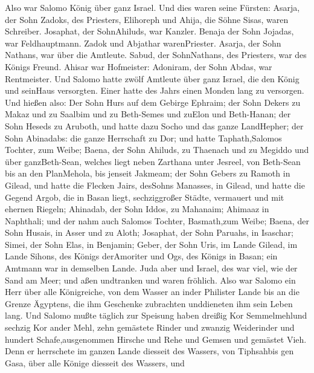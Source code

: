  Also war Salomo König über ganz Israel.  Und
dies waren seine Fürsten: Asarja, der Sohn Zadoks, des Priesters,
 Elihoreph und Ahija, die Söhne Sisas, waren Schreiber.
Josaphat, der SohnAhiluds, war Kanzler.  Benaja der Sohn
Jojadas, war Feldhauptmann. Zadok und Abjathar warenPriester.
 Asarja, der Sohn Nathans, war über die Amtleute. Sabud, der
SohnNathans, des Priesters, war des Königs Freund.  Ahisar
war Hofmeister: Adoniram, der Sohn Abdas, war Rentmeister. 
Und Salomo hatte zwölf Amtleute über ganz Israel, die den König und
seinHaus versorgten. Einer hatte des Jahrs einen Monden lang zu
versorgen.  Und hießen also: Der Sohn Hurs auf dem Gebirge
Ephraim;  der Sohn Dekers zu Makaz und zu Saalbim und zu
Beth-Semes und zuElon und Beth-Hanan;  der Sohn Heseds zu
Aruboth, und hatte dazu Socho und das ganze LandHepher; 
der Sohn Abinadabs: die ganze Herrschaft zu Dor; und hatte
Taphath,Salomos Tochter, zum Weibe;  Baena, der Sohn
Ahiluds, zu Thaenach und zu Megiddo und über ganzBeth-Sean, welches
liegt neben Zarthana unter Jesreel, von Beth-Sean bis an den PlanMehola,
bis jenseit Jakmeam;  der Sohn Gebers zu Ramoth in Gilead,
und hatte die Flecken Jairs, desSohns Manasses, in Gilead, und hatte die
Gegend Argob, die in Basan liegt, sechziggroßer Städte, vermauert und
mit ehernen Riegeln;  Ahinadab, der Sohn Iddos, zu
Mahanaim;  Ahimaaz in Naphthali; und der nahm auch Salomos
Tochter, Basmath,zum Weibe;  Baena, der Sohn Husais, in
Asser und zu Aloth;  Josaphat, der Sohn Paruahs, in
Isaschar;  Simei, der Sohn Elas, in Benjamin; 
Geber, der Sohn Uris, im Lande Gilead, im Lande Sihons, des Königs
derAmoriter und Ogs, des Königs in Basan; ein Amtmann war in demselben
Lande.  Juda aber und Israel, des war viel, wie der Sand am
Meer; und aßen undtranken und waren fröhlich.  Also war
Salomo ein Herr über alle Königreiche, von dem Wasser an inder Philister
Lande bis an die Grenze Ägyptens, die ihm Geschenke zubrachten
unddieneten ihm sein Leben lang.  Und Salomo mußte täglich
zur Speisung haben dreißig Kor Semmelmehlund sechzig Kor ander Mehl,
 zehn gemästete Rinder und zwanzig Weiderinder und hundert
Schafe,ausgenommen Hirsche und Rehe und Gemsen und gemästet Vieh.
 Denn er herrschete im ganzen Lande diesseit des Wassers,
von Tiphsahbis gen Gasa, über alle Könige diesseit des Wassers, und
